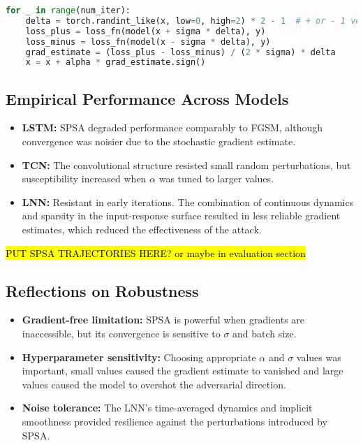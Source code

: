 \begin{lstlisting}[language=Python, caption={Simplified SPSA implementation}]
for _ in range(num_iter):
    delta = torch.randint_like(x, low=0, high=2) * 2 - 1  # + or - 1 vector
    loss_plus = loss_fn(model(x + sigma * delta), y)
    loss_minus = loss_fn(model(x - sigma * delta), y)
    grad_estimate = (loss_plus - loss_minus) / (2 * sigma) * delta
    x = x + alpha * grad_estimate.sign()
\end{lstlisting}

\subsection{Empirical Performance Across Models}
\begin{itemize}
    \item \textbf{LSTM:} SPSA degraded performance comparably to FGSM, although convergence was noisier due to the stochastic gradient estimate.
    \item \textbf{TCN:} The convolutional structure resisted small random perturbations, but susceptibility increased when $\alpha$ was tuned to larger values.
    \item \textbf{LNN:} Resistant in early iterations. The combination of continuous dynamics and sparsity in the input-response surface resulted in less reliable gradient estimates, which reduced the effectiveness of the attack.
\end{itemize}

\hl{PUT SPSA TRAJECTORIES HERE? or maybe in evaluation section}


\subsection{Reflections on Robustness}
\begin{itemize}
    \item \textbf{Gradient-free limitation:} SPSA is powerful when gradients are inaccessible, but its convergence is sensitive to $\sigma$ and batch size.
    \item \textbf{Hyperparameter sensitivity:} Choosing appropriate $\alpha$ and $\sigma$ values was important, small values caused the gradient estimate to vanished and large values caused the model to overshot the adversarial direction.
    \item \textbf{Noise tolerance:} The LNN's time-averaged dynamics and implicit smoothness provided resilience against the perturbations introduced by SPSA.
\end{itemize}

